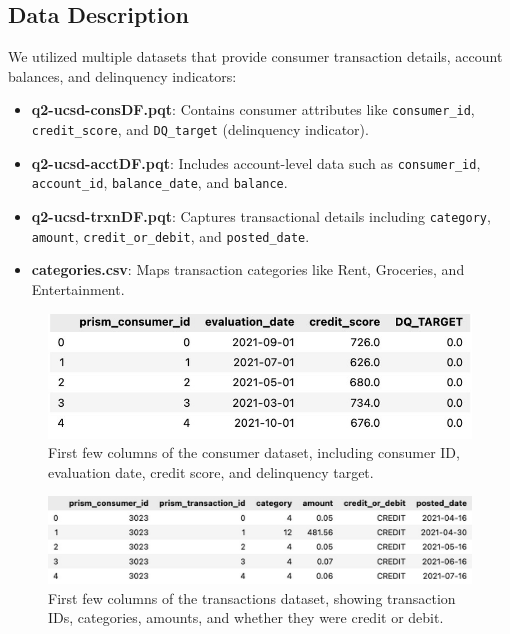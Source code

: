 \documentclass[12pt,letterpaper]{article}
\begin{document}
\subsection{Data Description}
We utilized multiple datasets that provide consumer transaction details, account balances, and delinquency indicators:
\begin{itemize}
    \item \textbf{q2-ucsd-consDF.pqt}: Contains consumer attributes like \texttt{consumer\_id}, \texttt{credit\_score}, and \texttt{DQ\_target} (delinquency indicator).
    \item \textbf{q2-ucsd-acctDF.pqt}: Includes account-level data such as \texttt{consumer\_id}, \texttt{account\_id}, \texttt{balance\_date}, and \texttt{balance}.
    \item \textbf{q2-ucsd-trxnDF.pqt}: Captures transactional details including \texttt{category}, \texttt{amount}, \texttt{credit\_or\_debit}, and \texttt{posted\_date}.
    \item \textbf{categories.csv}: Maps transaction categories like Rent, Groceries, and Entertainment.
\end{itemize}

\begin{figure}[H]
    \centering
    \includegraphics[width=\textwidth]{figure/consumer_df.jpeg}
    \caption{First few columns of the consumer dataset, including consumer ID, evaluation date, credit score, and delinquency target.}
    \label{fig:consumer_df}
\end{figure}

\begin{figure}[H]
    \centering
    \includegraphics[width=\textwidth]{figure/transactions_df.jpeg}
    \caption{First few columns of the transactions dataset, showing transaction IDs, categories, amounts, and whether they were credit or debit.}
    \label{fig:transactions_df}
\end{figure}
\end{document}
